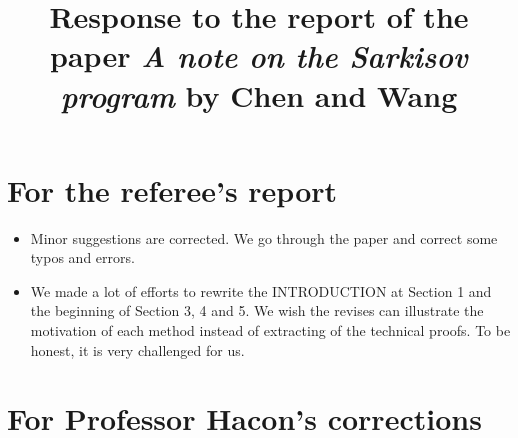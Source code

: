 \documentclass[11pt]{article}
\begin{document}
\title{Response to the report of the paper  \textit{A note on the Sarkisov program} by Chen and Wang}





\maketitle


\section{For the referee's report}

\begin{itemize}
\item Minor suggestions are corrected. We go through the paper and correct some typos and errors.

\bigskip

\item We made a lot of efforts to rewrite the INTRODUCTION at Section 1 and the beginning of Section 3, 4 and 5. We wish the revises can illustrate the motivation of each method instead of extracting of the technical proofs. To be honest, it is very challenged for us.

\end{itemize}

\section{For Professor Hacon's corrections}
\end{document}
